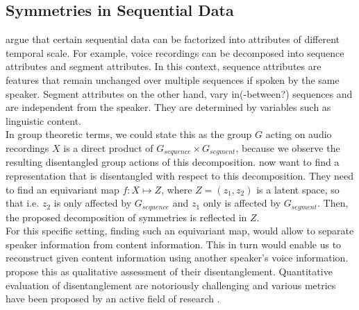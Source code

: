 \documentclass{article} %
\begin{document}
\subsection*{Symmetries in Sequential Data}
\citet{hsu2017unsupervised} argue that certain sequential data can be factorized into attributes of different temporal scale. For example, voice recordings can be decomposed into sequence attributes and segment attributes. In this context, sequence attributes are features that remain unchanged over multiple sequences if spoken by the same speaker. Segment attributes on the other hand, vary in(-between?) sequences and are independent from the speaker. They are determined by variables such as linguistic content.\\
In group theoretic terms, we could state this as the group $G$ acting on audio recordings $X$ is a direct product of $G_{sequence} \times G_{segment}$, because we observe the resulting disentangled group actions of this decomposition. \citet{hsu2017unsupervised} now want to find a representation that is disentangled with respect to this decomposition. They need to find an equivariant map $f:X\mapsto Z$, where $Z = (z_1, z_2)$ is a latent space, so that i.e. $z_2$ is only affected by $G_{sequence}$ and $z_1$ only is affected by $G_{segment}$. Then, the proposed decomposition of symmetries is reflected in $Z$.\\
For this specific setting, finding such an equivariant map, would allow to separate speaker information from content information. This in turn would enable us to reconstruct given content information using another speaker's voice information. \citet{hsu2017unsupervised} propose this as qualitative assessment of their disentanglement. Quantitative evaluation of disentanglement are notoriously challenging and various metrics have been proposed by an active field of research \cite{locatello2019challenging, higgins2016beta}.
\end{document}
